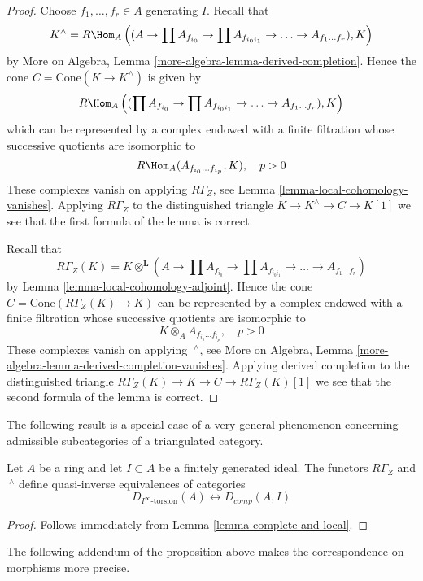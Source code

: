 \begin{proof}
Choose $f_1, \ldots, f_r \in A$ generating $I$. Recall that
$$
K^\wedge = R\Hom_A\left((A \to \prod A_{f_{i_0}}
\to \prod A_{f_{i_0i_1}} \to \ldots \to A_{f_1 \ldots f_r}), K\right)
$$
by More on Algebra, Lemma \ref{more-algebra-lemma-derived-completion}.
Hence the cone $C = \text{Cone}(K \to K^\wedge)$
is given by
$$
R\Hom_A\left((\prod A_{f_{i_0}}
\to \prod A_{f_{i_0i_1}} \to \ldots \to A_{f_1 \ldots f_r}), K\right)
$$
which can be represented by a complex endowed with a finite filtration
whose successive quotients are isomorphic to
$$
R\Hom_A(A_{f_{i_0} \ldots f_{i_p}}, K), \quad p > 0
$$
These complexes vanish on applying $R\Gamma_Z$, see
Lemma \ref{lemma-local-cohomology-vanishes}. Applying $R\Gamma_Z$
to the distinguished triangle $K \to K^\wedge \to C \to K[1]$
we see that the first formula of the lemma is correct.

\medskip\noindent
Recall that
$$
R\Gamma_Z(K) =
K \otimes^\mathbf{L} (A \to \prod A_{f_{i_0}}
\to \prod A_{f_{i_0i_1}} \to \ldots \to A_{f_1 \ldots f_r})
$$
by Lemma \ref{lemma-local-cohomology-adjoint}.
Hence the cone $C = \text{Cone}(R\Gamma_Z(K) \to K)$
can be represented by a complex endowed with a finite filtration
whose successive quotients are isomorphic to
$$
K \otimes_A A_{f_{i_0} \ldots f_{i_p}}, \quad p > 0
$$
These complexes vanish on applying ${\ }^\wedge$, see
More on Algebra, Lemma \ref{more-algebra-lemma-derived-completion-vanishes}.
Applying derived completion to the distinguished triangle
$R\Gamma_Z(K) \to K \to C \to R\Gamma_Z(K)[1]$
we see that the second formula of the lemma is correct.
\end{proof}

\noindent
The following result is a special case of a very general phenomenon
concerning admissible subcategories of a triangulated category.

\begin{proposition}
\label{proposition-torsion-complete}
Let $A$ be a ring and let $I \subset A$ be a finitely generated ideal.
The functors $R\Gamma_Z$ and ${\ }^\wedge$
define quasi-inverse equivalences of categories
$$
D_{I^\infty\text{-torsion}}(A) \leftrightarrow D_{comp}(A, I)
$$
\end{proposition}

\begin{proof}
Follows immediately from Lemma \ref{lemma-complete-and-local}.
\end{proof}

\noindent
The following addendum of the proposition above makes the
correspondence on morphisms more precise.

